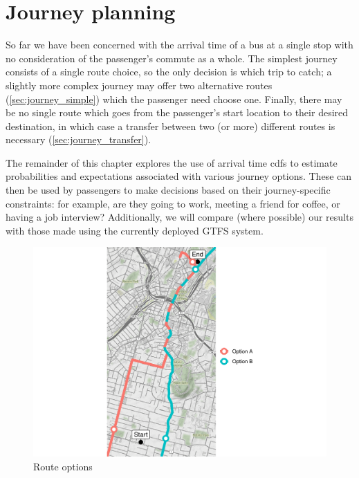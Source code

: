 \section{Journey planning}
\label{sec:etas-journey-planning}

So far we have been concerned with the arrival time of a bus at a single stop with no consideration of the passenger's commute as a whole. The simplest journey consists of a single route choice, so the only decision is which trip to catch; a slightly more complex journey may offer two alternative routes (\cref{sec:journey_simple}) which the passenger need choose one. Finally, there may be no single route which goes from the passenger's start location to their desired destination, in which case a transfer between two (or more) different routes is necessary (\cref{sec:journey_transfer}).

The remainder of this chapter explores the use of arrival time \glspl{cdf} to estimate probabilities and expectations associated with various journey options. These can then be used by passengers to make decisions based on their journey-specific constraints: for example, are they going to work, meeting a friend for coffee, or having a job interview? Additionally, we will compare (where possible) our results with those made using the currently deployed GTFS system.


\begin{knitrout}\small
{}\color{fgcolor}\begin{figure}

{\centering \includegraphics[width=\textwidth]{figure/eta_journey_arrival_prep-1} 

}

\caption[Route options]{Route options}\label{fig:eta_journey_arrival_prep}
\end{figure}


\end{knitrout}


